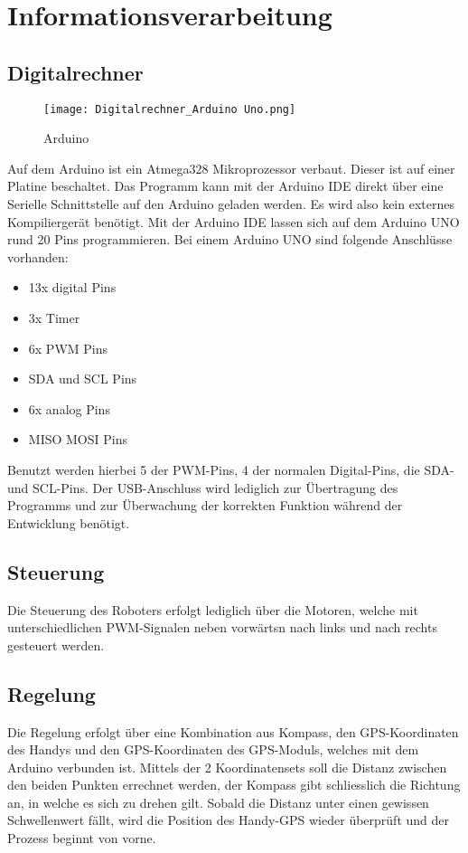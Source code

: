 \section{Informationsverarbeitung}

\subsection{Digitalrechner}
\begin{figure}[H]
    \begin{center}
    \texttt{[image: Digitalrechner\_Arduino Uno.png]}
    \end{center}
    \caption{Arduino}
\end{figure}

Auf dem Arduino ist ein Atmega328 Mikroprozessor verbaut. Dieser ist auf einer Platine beschaltet. Das Programm kann mit der Arduino IDE direkt über eine Serielle Schnittstelle auf den Arduino geladen werden. Es wird also kein externes Kompiliergerät benötigt. Mit der Arduino IDE lassen sich auf dem Arduino UNO rund 20 Pins programmieren. Bei einem Arduino UNO sind folgende Anschlüsse vorhanden:

\begin{itemize}
    \item 13x digital Pins 
    \item 3x Timer 
    \item 6x PWM Pins 
    \item SDA und SCL Pins 
    \item 6x analog Pins 
    \item MISO MOSI Pins
\end{itemize}

Benutzt werden hierbei 5 der PWM-Pins, 4 der normalen Digital-Pins, die SDA- und SCL-Pins. Der USB-Anschluss wird lediglich zur Übertragung des Programms und zur Überwachung der korrekten Funktion während der Entwicklung benötigt.


\subsection{Steuerung}
Die Steuerung des Roboters erfolgt lediglich über die Motoren, welche mit unterschiedlichen PWM-Signalen neben vorwärtsn nach links und nach rechts gesteuert werden. 

\subsection{Regelung}
Die Regelung erfolgt über eine Kombination aus Kompass, den GPS-Koordinaten des Handys und den GPS-Koordinaten des GPS-Moduls, welches mit dem Arduino verbunden ist. Mittels der 2 Koordinatensets soll die Distanz zwischen den beiden Punkten errechnet werden, der Kompass gibt schliesslich die Richtung an, in welche es sich zu drehen gilt. Sobald die Distanz unter einen gewissen Schwellenwert fällt, wird die Position des Handy-GPS wieder überprüft und der Prozess beginnt von vorne.